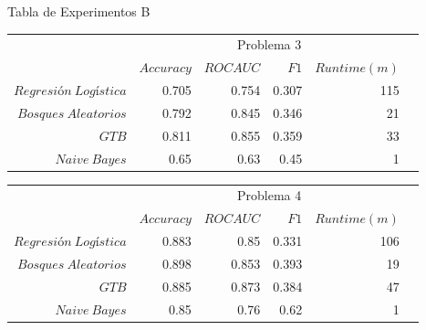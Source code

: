 \documentclass[xcolor=x11names]{beamer}
\newcommand{\ra}[1]{\renewcommand{\arraystretch}{#1}}
\begin{document}
\begin{frame}{Tabla de Experimentos B}

	\begin{table}[htp]\centering
	\footnotesize
		\ra{1.3}
		\begin{tabular}{@{}rr@{\hskip 0.3cm}r@{\hskip 0.3cm}r@{\hskip 0.3cm}rc@{}} \toprule
			&  \multicolumn{4}{c}{Problema 3} \\
			\cmidrule{2-5}
			& $Accuracy$ & $ROC AUC$ & $F1$ & $Runtime  (m)$ \\ \midrule
			$Regresión \ Logística$     & 0.705 & 0.754 & 0.307 & 115 \\
			$Bosques \ Aleatorios$            &  0.792 & 0.845 & 0.346 & 21 \\
			$GTB$ & 0.811 & 0.855 & 0.359 & 33 \\
			$Naive \ Bayes$               & 0.65  & 0.63  & 0.45  & 1  \\

			\bottomrule
		\end{tabular}
		\ra{1.3}
		\begin{tabular}{@{}rr@{\hskip 0.3cm}r@{\hskip 0.3cm}r@{\hskip 0.3cm}rc@{}} \toprule
			&  \multicolumn{4}{c}{Problema 4} \\
			\cmidrule{2-5}
			& $Accuracy$ & $ROC AUC$ & $F1$ & $Runtime  (m)$ \\ \midrule
			$Regresión \ Logística$     & 0.883 & 0.85  & 0.331 & 106 \\
			$Bosques \ Aleatorios$            & 0.898 & 0.853 & 0.393 & 19 \\
			$GTB$ & 0.885 & 0.873 & 0.384 & 47 \\
			$Naive \ Bayes$               & 0.85  & 0.76  & 0.62 & 1 \\

			\bottomrule
		\end{tabular}
	\end{table}

\end{frame}
\end{document}
